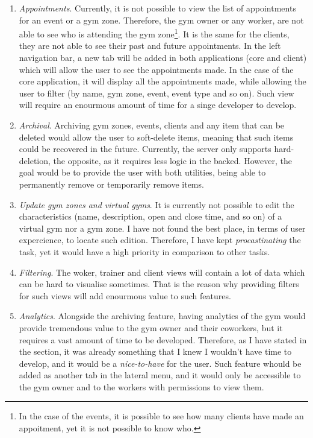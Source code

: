 \documentclass[a4paper, 12pt, oneside]{book}
\begin{document}
\begin{enumerate}[label = -]
	\item \emph{Appointments}. Currently, it is not possible to view the list of appointments for an event or a gym zone. Therefore, the gym owner or any worker, are not able to see who is attending the gym zone\footnote{In the case of the events, it is possible to see how many clients have made an appoitment, yet it is not possible to know who.}. It is the same for the clients, they are not able to see their past and future appointments.
	      \newline
	      In the left navigation bar, a new tab will be added in both applications (core and client) which will allow the user to see the appointments made. In the case of the core application, it will display all the appointments made, while allowing the user to filter (by name, gym zone, event, event type and so on). Such view will require an enourmous amount of time for a singe developer to develop.
	\item \emph{Archival}. Archiving gym zones, events, clients and any item that can be deleted would allow the user to soft-delete items, meaning that such items could be recovered in the future. Currently, the server only supports hard-deletion, the opposite, as it requires less logic in the backed. However, the goal would be to provide the user with both utilities, being able to permanently remove or temporarily remove items.
	\item \emph{Update gym zones and virtual gyms}. It is currently not possible to edit the characteristics (name, description, open and close time, and so on) of a virtual gym nor a gym zone. I have not found the best place, in terms of user expercience, to locate such edition. Therefore, I have kept \emph{procastinating} the task, yet it would have a high priority in comparison to other tasks.
	\item \emph{Filtering}. The woker, trainer and client views will contain a lot of data which can be hard to visualise sometimes. That is the reason why providing filters for such views will add enourmous value to such features.
	\item \emph{Analytics}. Alongside the archiving feature, having analytics of the gym would provide tremendous value to the gym owner and their coworkers, but it requires a vast amount of time to be developed. Therefore, as I have stated in the  section, it was already something that I knew I wouldn't have time to develop, and it would be a \emph{nice-to-have} for the user. Such feature whould be added as another tab in the lateral menu, and it would only be accessible to the gym owner and to the workers with permissions to view them.

\end{enumerate}
\end{document}
